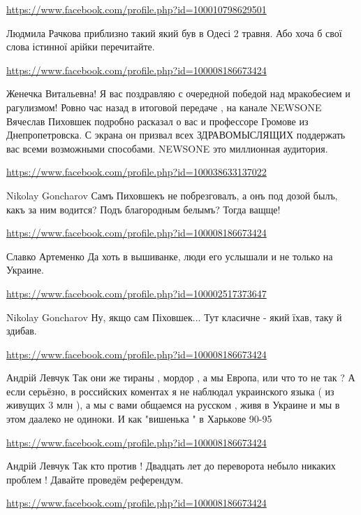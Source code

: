 \documentclass[a4paper,11pt]{extreport}
\begin{document}
\begin{itemize}
\begin{itemize}
\url{https://www.facebook.com/profile.php?id=100010798629501}

Людмила Рачкова приблизно такий який був в Одесі 2 травня.
Або хоча б свої слова істинної арійки перечитайте.

\end{itemize}
\url{https://www.facebook.com/profile.php?id=100008186673424}

Женечка Витальевна! Я вас поздравляю с очередной победой над мракобесием и рагулизмом! Ровно час назад в итоговой передаче , на канале NEWSONE Вячеслав Пиховшек подробно расказал о вас и профессоре Громове из Днепропетровска. С экрана он призвал всех ЗДРАВОМЫСЛЯЩИХ поддержать вас всеми возможными способами. NEWSONE это миллионная аудитория.

\begin{itemize}
\url{https://www.facebook.com/profile.php?id=100038633137022}

Nikolay Goncharov Самъ Пиховшекъ не побрезговалъ, а онъ под дозой былъ, какъ за ним водится? Подъ благородным белымъ? Тогда ващще!

\url{https://www.facebook.com/profile.php?id=100008186673424}

Славко Артеменко Да хоть в вышиванке, люди его услышали и не только на Украине.

\url{https://www.facebook.com/profile.php?id=100002517373647}

Nikolay Goncharov Ну, якщо сам Піховшек... Тут класичне - який їхав, таку й здибав.

\url{https://www.facebook.com/profile.php?id=100008186673424}

Андрій Левчук Так они же тираны , мордор , а мы Европа, или что то не так ? А если серьёзно, в российских коментах я не наблюдал украинского языка ( из живущих 3 млн ), а мы с вами общаемся на русском , живя в Украине и мы в этом даалеко не одиноки. И как "вишенька " в Харькове 90-95%

\url{https://www.facebook.com/profile.php?id=100008186673424}

Андрій Левчук Так кто против ! Двадцать лет до переворота небыло никаких проблем ! Давайте проведём референдум.

\url{https://www.facebook.com/profile.php?id=100008186673424}


\end{itemize}
\end{itemize}
\end{document}
